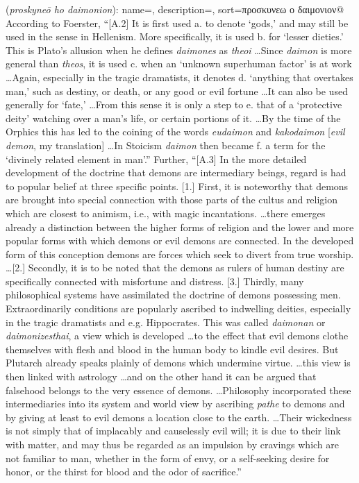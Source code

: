 \item[Demon worship,]

(\textit{proskyneō ho daimonion}):
{
    name=,
    description={},
    sort=προσκυνεω ο δαιμονιον@
}
According to Foerster, ``[A.2] It is first used a. to denote `gods,' and may still be used in the sense in Hellenism. More specifically, it is used b. for `lesser dieties.' This is Plato's allusion when he defines \emph{daimones} as \emph{theoi} \ldots Since \emph{daimon} is more general than \emph{theos}, it is used c. when an `unknown superhuman factor' is at work \ldots Again, especially in the tragic dramatists, it denotes d. `anything that overtakes man,' such as destiny, or death, or any good or evil fortune \ldots It can also be used generally for `fate,' \ldots From this sense it is only a step to e. that of a `protective deity' watching over a man's life, or certain portions of it. \ldots By the time of the Orphics this has led to the coining of the words \emph{eudaimon} and \emph{kakodaimon} [\emph{evil demon}, my translation] \ldots In Stoicism  \emph{daimon} then became f. a term for the `divinely related element in man'.'' 
Further, ``[A.3] In the more detailed development of the doctrine that demons are intermediary beings, regard is had to popular belief at three specific points. [1.] First, it is noteworthy that demons are brought into special connection with those parts of the cultus  and religion which are closest to animism, i.e., with magic incantations. \ldots there emerges already a distinction between the higher forms of religion and the lower and more popular forms with which demons or evil demons are connected. In the developed form of this conception demons are forces which seek to divert from true worship. \ldots [2.] Secondly, it is to be noted that the demons as rulers of human destiny are specifically connected with misfortune and distress. [3.] Thirdly, many philosophical systems have assimilated the doctrine of demons possessing men. Extraordinarily conditions are popularly ascribed to indwelling deities, especially in the tragic dramatists and e.g. Hippocrates. This was called \emph{daimonan} or \emph{daimonizesthai}, a view which is developed \ldots to the effect that evil demons clothe themselves with flesh and blood in the human body to kindle evil desires. But Plutarch already speaks plainly of demons which undermine virtue. \ldots this view is then linked with astrology \ldots and on the other hand it can be argued that falsehood belongs to the very essence of demons. \ldots Philosophy incorporated these intermediaries  into its system and world view by ascribing \emph{pathe} to demons and by giving at least to evil demons a location close to the earth. \ldots Their wickedness is not simply that of implacably and causelessly evil will; it is due to their link with matter, and may thus be regarded as an impulsion by cravings which are not familiar to man, whether in the form of envy, or a self-seeking desire for honor, or the thirst for blood and the odor of sacrifice.''
